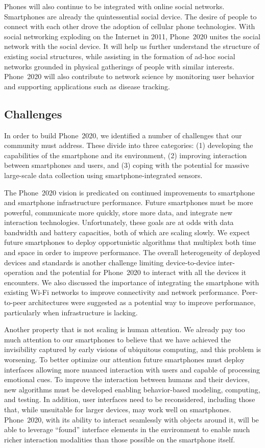 Phones will also continue to be integrated with online social networks.
Smartphones are already the quintessential social device. The desire of
people to connect with each other drove the adoption of cellular phone
technologies. With social networking exploding on the Internet in 2011,
Phone~2020 unites the social network with the social device. It will help us
further understand the structure of existing social structures, while
assisting in the formation of ad-hoc social networks grounded in physical
gatherings of people with similar interests. Phone~2020 will also contribute
to network science by monitoring user behavior and supporting applications
such as disease tracking.

\subsection{Challenges}

In order to build Phone~2020, we identified a number of challenges that our
community must address. These divide into three categories: (1) developing
the capabilities of the smartphone and its environment, (2) improving
interaction between smartphones and users, and (3) coping with the potential
for massive large-scale data collection using smartphone-integrated sensors.
 
The Phone~2020 vision is predicated on continued improvements to smartphone
and smartphone infrastructure performance. Future smartphones must be more
powerful, communicate more quickly, store more data, and integrate new
interaction technologies. Unfortunately, these goals are at odds with data
bandwidth and battery capacities, both of which are scaling slowly. We expect
future smartphones to deploy opportunistic algorithms that multiplex both
time and space in order to improve performance. The overall heterogeneity of
deployed devices and standards is another challenge limiting device-to-device
inter-operation and the potential for Phone~2020 to interact with all the
devices it encounters. We also discussed the importance of integrating the
smartphone with existing Wi-Fi networks to improve connectivity and network
performance. Peer-to-peer architectures were suggested as a potential way to
improve performance, particularly when infrastructure is lacking.
 
Another property that is not scaling is human attention. We already pay too
much attention to our smartphones to believe that we have achieved the
invisibility captured by early visions of ubiquitous computing, and this
problem is worsening. To better optimize our attention future smartphones
must deploy interfaces allowing more nuanced interaction with users and
capable of processing emotional cues. To improve the interaction between
humans and their devices, new algorithms must be developed enabling
behavior-based modeling, computing, and testing. In addition, user interfaces
need to be reconsidered, including those that, while unsuitable for larger
devices, may work well on smartphones. Phone~2020, with its ability to
interact seamlessly with objects around it, will be able to leverage
``found'' interface elements in the environment to enable much richer
interaction modalities than those possible on the smartphone itself.
 
